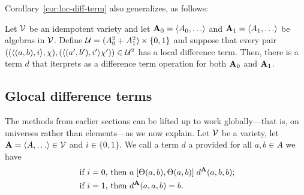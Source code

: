 Corollary~\ref{cor:loc-diff-term} also generalizes, as follows:
\begin{cor}
  \label{cor:mix-loc-diff-term}
  Let $\mathcal{V}$ be an idempotent variety and let
  $\bA_0 = \<A_0, \dots\>$ and   $\bA_1 = \<A_1, \dots\>$ be algebras in $\mathcal{V}$. Define
  $\mathcal{U}  = (A_0^2 + A_1^2)\times \{0,1\}$
  and suppose that every pair
  $((\langle(a, b), i\rangle, \chi), (\langle(a', b'), i'\rangle\chi')) \in \mathcal{U}^2$
  has a local difference term. Then, there is a term $d$ that iterprets as a
  difference term operation for both $\mathbf{A}_0$ and $\mathbf{A}_1$.
\end{cor}





\subsection{Glocal difference terms}
\label{sec:glob-local-diff}
The methods from earlier sections can be lifted up to work globally---that is,
on universes rather than elements---as we now explain. 
Let $\mathcal{V}$ be a variety, let $\bA = \<A, \dots\> \in \sV$ 
and $i\in \{0,1\}$.
We call a term $d$ a 
provided for all $a, b\in A$  we have
\begin{align}
\text{ if $i=0$, then } & a \comm{\Cg(a,b)}{\Cg(a,b)} d^{\bA}(a,b,b);
\label{eq:global-diff-triple}\\
\text{ if $i=1$, then } &
d^{\bA}(a,a,b) = b. 
\end{align}

